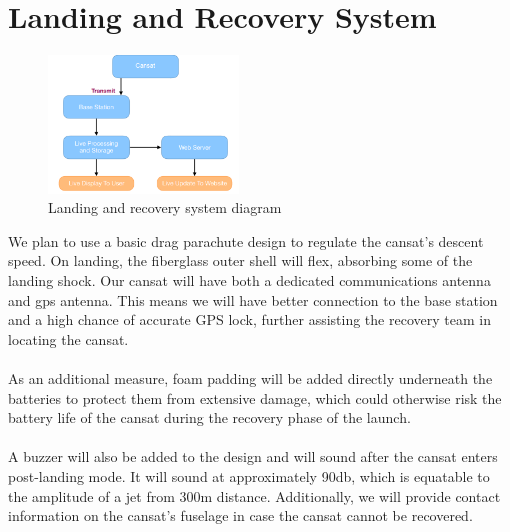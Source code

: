 \documentclass{report}
\begin{document}
	\section{Landing and Recovery System}

		\begin{figure}
			\vspace{-30pt}
	 		\begin{center}
			\includegraphics[width=0.45\textwidth]{ground}
			\end{center}
			\vspace{-15pt}
			\caption[X]{Landing and recovery system diagram}
		\end{figure}

		We plan to use a basic drag parachute design to regulate the cansat’s 
		descent speed. On landing, the fiberglass outer shell will flex, absorbing 
		some of the landing shock. Our cansat will have both a dedicated
		communications antenna and gps antenna. This means we will have 
		better connection to the base station and a high chance of accurate GPS lock,
		further assisting the recovery team in locating the cansat.
		\\\\
		{\color{blue}As an additional measure, foam padding will be added 
		directly underneath the batteries to protect them from extensive damage,
		which
		could otherwise risk the battery life of the cansat during the recovery 
		phase of
		the launch.
		\\\\
		A buzzer will also be added to the design and will sound
		after the cansat enters post-landing mode. It will sound at approximately
		90db, which is equatable to the amplitude of a jet from 300m distance.
		Additionally, we will provide contact information on the cansat's fuselage
		in case the cansat cannot be recovered.}
\end{document}
